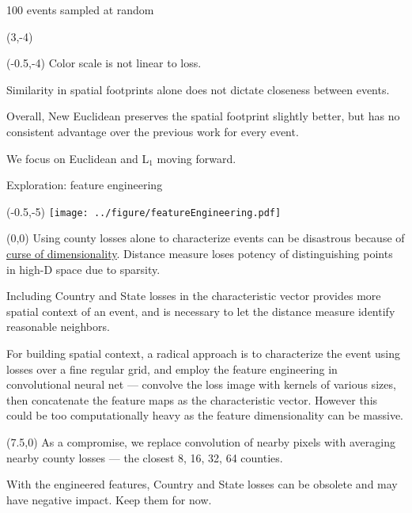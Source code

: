 \documentclass[aspectratio=169]{beamer}
\begin{document}
\begin{frame}{100 events sampled at random }

\begin{textblock}{1}(3,-4)
\end{textblock}

\begin{textblock}{3}(-0.5,-4)
\scriptsize Color scale is not linear to loss.\bigskip

\scriptsize Similarity in spatial footprints alone does not dictate closeness between events.\bigskip\pause

\scriptsize Overall, New Euclidean preserves the spatial footprint slightly better, but has no consistent advantage over the previous work for every event.\bigskip

\scriptsize We focus on Euclidean and L$_1$ moving forward.
\end{textblock}
\end{frame}



\begin{frame}{Exploration: feature engineering}
\begin{textblock}{1}(-0.5,-5)
\texttt{[image: ../figure/featureEngineering.pdf]}
\end{textblock}

\begin{textblock}{6}(0,0)
\tiny Using county losses alone to characterize events can be disastrous because of \underline{\textcolor{blue}{\href{https://en.wikipedia.org/wiki/Curse_of_dimensionality}{curse of dimensionality}}}. Distance measure loses potency of distinguishing points in high-D space due to sparsity.\bigskip\pause

\tiny Including Country and State losses in the characteristic vector provides more spatial context of an event, and is necessary to let the distance measure identify reasonable neighbors.\bigskip\pause

\tiny For building spatial context, a radical approach is to characterize the event using losses over a fine regular grid, and employ the feature engineering in convolutional neural net --- convolve the loss image with kernels of various sizes, then concatenate the feature maps as the characteristic vector. However this could be too computationally heavy as the feature dimensionality can be massive.\bigskip


\end{textblock}

\begin{textblock}{6}(7.5,0)
\tiny As a compromise, we replace convolution of nearby pixels with averaging nearby county losses --- the closest 8, 16, 32, 64 counties.\bigskip\pause

\tiny With the engineered features, Country and State losses can be obsolete and may have negative impact. Keep them for now.
\end{textblock}

\end{frame}
\end{document}
